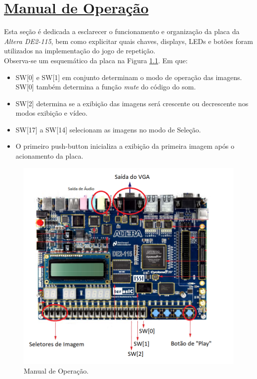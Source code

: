 \documentclass[14pt, oneside]{book}
\newcommand\tab[1][1cm]{\hspace*{#1}}
\theoremstyle{definition}
\begin{document}
                
         \chapter[Manual de Operação]{\hyperlink{toc}{Manual de Operação}}
                \tab Esta seção é dedicada a esclarecer o funcionamento e organização da placa da \textit{Altera DE2-115}, bem como explicitar quais chaves, displays, LEDs e botões foram utilizados na implementação do jogo de repetição. \\
                \tab Observa-se um esquemático da placa na Figura \ref{manual}. Em que:
              
                \begin{itemize}
                    \item SW[0] e SW[1] em conjunto determinam o modo de operação das imagens. SW[0] também determina a função \textit{mute} do código do som. 
                    \item SW[2] determina se a exibição das imagens será crescente ou decrescente nos modos exibição e vídeo.
                    \item SW[17] a SW[14] selecionam as imagens no modo de Seleção.
                    \item O primeiro push-button inicializa a exibição da primeira imagem após o acionamento da placa. 
                \end{itemize}
                
                \begin{figure}[H]
                    \centering
                    \includegraphics[scale=0.9]{manual.png}
                    \caption{Manual de Operação.}
                    \label{manual}
                \end{figure}\\
                
\end{document}

